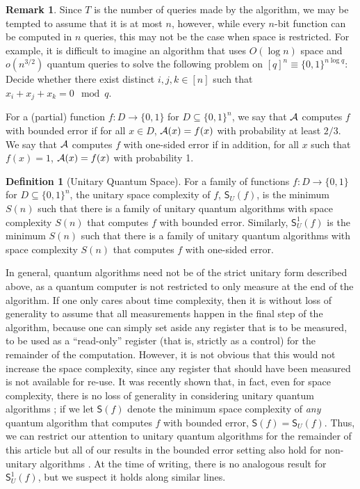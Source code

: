 \documentclass[11pt]{article}
\numberwithin{equation}{section}
\theoremstyle{definition}
\newtheorem{definition}[theorem]{Definition}
\newtheorem{remark}[theorem]{Remark}
\theoremstyle{plain}
\begin{document}
\begin{remark}
Since $T$ is the number of queries made by the algorithm, we may be tempted to assume that it is at most $n$, however, while every $n$-bit function can be computed in $n$ queries, this may not be the case when space is restricted. For example, it is difficult to imagine an algorithm that uses $O(\log n)$ space and $o(n^{3/2})$ quantum queries to solve the following problem on $[q]^n\equiv \{0,1\}^{n\log q}$: Decide whether there exist distinct $i,j,k\in [n]$ such that $x_i+x_j+x_k=0\mod q$. 
\end{remark}


For a (partial) function $f:D\rightarrow\{0,1\}$ for $D\subseteq \{0,1\}^n$, we say that ${\cal A}$ computes $f$ with bounded error if for all $x\in D$, ${\cal A}(x)=f(x)$ with probability at least $2/3$. We say that ${\cal A}$ computes $f$ with one-sided error if in addition, for all $x$ such that $f(x)=1$, ${\cal A}(x)=f(x)$ with probability 1.

\begin{definition}[Unitary Quantum Space]\label{def:unitary-space}
For a family of functions $f:D\rightarrow\{0,1\}$ for $D\subseteq\{0,1\}^n$, the unitary space complexity of $f$, $\mathsf{S}_U(f)$, is the minimum $S(n)$ such that there is a family of unitary quantum algorithms with space complexity $S(n)$ that computes $f$ with bounded error. Similarly, $\mathsf{S}_U^1(f)$ is the minimum $S(n)$ such that there is a family of unitary quantum algorithms with space complexity $S(n)$ that computes $f$ with one-sided error. 
\end{definition}

In general, quantum algorithms need not be of the strict unitary form described above, as a quantum computer is not restricted to only measure at the end of the algorithm. If one only cares about time complexity, then it is without loss of generality to assume that all measurements happen in the final step of the algorithm, because one can simply set aside any register that is to be measured, to be used as a ``read-only'' register (that is, strictly as a control) for the remainder of the computation. However, it is not obvious that this would not increase the space complexity, since any register that should have been measured is not available for re-use. It was recently shown that, in fact, even for space complexity, there is no loss of generality in considering unitary quantum algorithms \cite{FR21,GRZ20}; if we let $\mathsf{S}(f)$ denote the minimum space complexity of \emph{any} quantum algorithm that computes $f$ with bounded error, $\mathsf{S}(f)=\mathsf{S}_U(f)$. Thus, we can restrict our attention to unitary quantum algorithms for the remainder of this
%
article  %
but  all of our results in the bounded error setting also hold for non-unitary algorithms \cite{FR21,GRZ20}. At the time of writing, there is no analogous result for $\mathsf{S}_U^1(f)$, but we suspect it holds along similar lines. 
\end{document}

